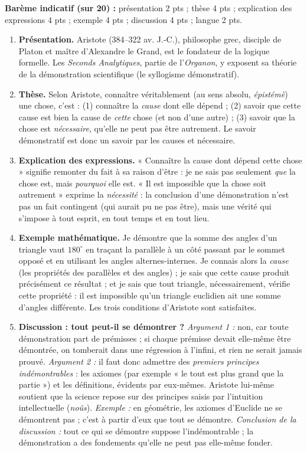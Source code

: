 \documentclass[11pt]{article}
\begin{document}
\begin{corrige}
\textbf{Barème indicatif (sur 20) :} présentation 2 pts ; thèse 4 pts ; explication des expressions 4 pts ; exemple 4 pts ; discussion 4 pts ; langue 2 pts.

\begin{enumerate}
\item \textbf{Présentation.} Aristote (384--322 av. J.-C.), philosophe grec, disciple de Platon et maître d'Alexandre le Grand, est le fondateur de la logique formelle. Les \emph{Seconds Analytiques}, partie de l'\emph{Organon}, y exposent sa théorie de la démonstration scientifique (le syllogisme démonstratif).
\item \textbf{Thèse.} Selon Aristote, connaître véritablement (au sens absolu, \emph{épistémè}) une chose, c'est : (1) connaître la \emph{cause} dont elle dépend ; (2) savoir que cette cause est bien la cause de \emph{cette} chose (et non d'une autre) ; (3) savoir que la chose est \emph{nécessaire}, qu'elle ne peut pas être autrement. Le savoir démonstratif est donc un savoir par les causes et nécessaire.
\item \textbf{Explication des expressions.} « Connaître la cause dont dépend cette chose » signifie remonter du fait à sa raison d'être : je ne sais pas seulement \emph{que} la chose est, mais \emph{pourquoi} elle est. « Il est impossible que la chose soit autrement » exprime la \emph{nécessité} : la conclusion d'une démonstration n'est pas un fait contingent (qui aurait pu ne pas être), mais une vérité qui s'impose à tout esprit, en tout temps et en tout lieu.
\item \textbf{Exemple mathématique.} Je démontre que la somme des angles d'un triangle vaut $180^{\circ}$ en traçant la parallèle à un côté passant par le sommet opposé et en utilisant les angles alternes-internes. Je connais alors la \emph{cause} (les propriétés des parallèles et des angles) ; je sais que cette cause produit précisément ce résultat ; et je sais que tout triangle, nécessairement, vérifie cette propriété : il est impossible qu'un triangle euclidien ait une somme d'angles différente. Les trois conditions d'Aristote sont satisfaites.
\item \textbf{Discussion : tout peut-il se démontrer ?} \emph{Argument 1 :} non, car toute démonstration part de prémisses ; si chaque prémisse devait elle-même être démontrée, on tomberait dans une régression à l'infini, et rien ne serait jamais prouvé. \emph{Argument 2 :} il faut donc admettre des \emph{premiers principes indémontrables} : les axiomes (par exemple « le tout est plus grand que la partie ») et les définitions, évidents par eux-mêmes. Aristote lui-même soutient que la science repose sur des principes saisis par l'intuition intellectuelle (\emph{noûs}). \emph{Exemple :} en géométrie, les axiomes d'Euclide ne se démontrent pas ; c'est à partir d'eux que tout se démontre. \emph{Conclusion de la discussion :} tout ce qui se démontre suppose l'indémontrable ; la démonstration a des fondements qu'elle ne peut pas elle-même fonder.

\end{enumerate}
\end{corrige}
\end{document}
